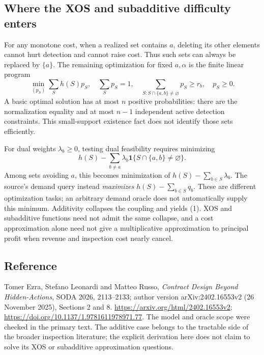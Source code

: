 \documentclass[11pt,a4paper]{article}
\newcommand{\ind}{\mathbf 1}
\begin{document}
\subsection*{Where the XOS and subadditive difficulty enters}
For any monotone cost, when a realized set contains $a$, deleting its other elements cannot hurt detection and cannot raise cost. Thus such sets can always be replaced by $\{a\}$. The remaining optimization for fixed $a,\alpha$ is the finite linear program
\[
 \min_{(p_S)}\sum_Sh(S)p_S,\quad
 \sum_Sp_S=1,\quad
 \sum_{S:S\cap\{a,b\}\ne\varnothing}p_S\geq r_b,\quad p_S\geq0.
\]
A basic optimal solution has at most $n$ positive probabilities: there are the normalization equality and at most $n-1$ independent active detection constraints. This small-support existence fact does not identify those sets efficiently.

For dual weights $\lambda_b\geq0$, testing dual feasibility requires minimizing
\[
 h(S)-\sum_{b\ne a}\lambda_b\ind\{S\cap\{a,b\}\ne\varnothing\}.
\]
Among sets avoiding $a$, this becomes minimization of $h(S)-\sum_{b\in S}\lambda_b$. The source's demand query instead \emph{maximizes} $h(S)-\sum_{b\in S}q_b$. These are different optimization tasks; an arbitrary demand oracle does not automatically supply this minimum. Additivity collapses the coupling and yields (1). XOS and subadditive functions need not admit the same collapse, and a cost approximation alone need not give a multiplicative approximation to principal profit when revenue and inspection cost nearly cancel.

\subsection*{Reference}
Tomer Ezra, Stefano Leonardi and Matteo Russo, \emph{Contract Design Beyond Hidden-Actions}, SODA 2026, 2113--2133; author version arXiv:2402.16553v2 (26 November 2025), Sections 2 and 8. \url{https://arxiv.org/html/2402.16553v2}; \url{https://doi.org/10.1137/1.9781611978971.77}. The model and oracle scope were checked in the primary text. The additive case belongs to the tractable side of the broader inspection literature; the explicit derivation here does not claim to solve its XOS or subadditive approximation questions.
\end{document}
